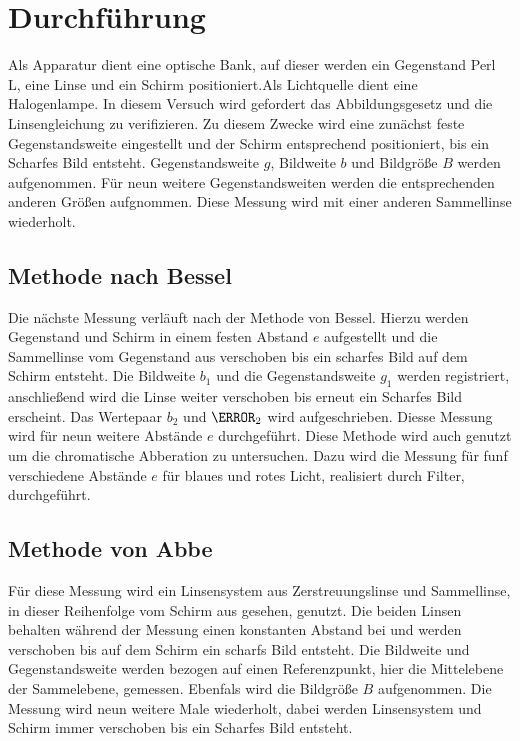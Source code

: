 \section{Durchführung}
\label{sec:Durchführung}
Als Apparatur dient eine optische Bank, auf dieser werden ein Gegenstand Perl L, eine Linse und ein Schirm
positioniert.Als Lichtquelle dient eine Halogenlampe.
In diesem Versuch wird gefordert das Abbildungsgesetz und die Linsengleichung zu verifizieren.
Zu diesem Zwecke wird eine zunächst feste Gegenstandsweite eingestellt und der Schirm entsprechend
positioniert, bis ein Scharfes Bild entsteht. Gegenstandsweite $g$, Bildweite $b$ und Bildgröße $B$ werden
aufgenommen. Für neun weitere Gegenstandsweiten werden die entsprechenden anderen Größen aufgnommen.
Diese Messung wird mit einer anderen Sammellinse wiederholt.
\subsection{Methode nach Bessel}
Die nächste Messung verläuft nach der Methode von Bessel. Hierzu werden Gegenstand und Schirm
in einem festen Abstand $e$ aufgestellt und die Sammellinse vom Gegenstand aus verschoben bis ein scharfes Bild
auf dem Schirm entsteht. Die Bildweite $b_\mathrm{1}$ und die Gegenstandsweite $g_\mathrm{1}$ werden
registriert, anschließend wird die Linse weiter verschoben bis erneut ein Scharfes Bild erscheint.
Das Wertepaar $b_\mathrm{2}$ und $\g_\mathrm{2}$ wird aufgeschrieben. Diesse Messung wird für neun
weitere Abstände $e$ durchgeführt.
Diese Methode wird auch genutzt um die chromatische Abberation zu untersuchen. Dazu wird die Messung
für funf verschiedene Abstände $e$ für blaues und rotes Licht, realisiert durch Filter, durchgeführt.
\subsection{Methode von Abbe}
Für diese Messung wird ein Linsensystem aus Zerstreuungslinse und Sammellinse, in dieser Reihenfolge
vom Schirm aus gesehen, genutzt. Die beiden Linsen behalten während der Messung einen konstanten Abstand
bei und werden verschoben bis auf dem Schirm ein scharfs Bild entsteht. Die Bildweite und Gegenstandsweite
werden bezogen auf einen Referenzpunkt, hier die Mittelebene der Sammelebene, gemessen. Ebenfals wird die
Bildgröße $B$ aufgenommen. Die Messung wird neun weitere Male wiederholt, dabei werden Linsensystem und
Schirm immer verschoben bis ein Scharfes Bild entsteht.
